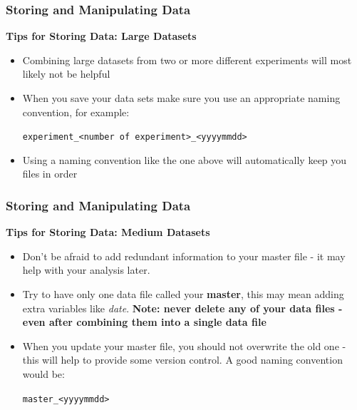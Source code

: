 \documentclass{beamer}
\begin{document}
\begin{frame}[fragile]
\frametitle{Storing and Manipulating Data}
\textbf{Tips for Storing Data: Large Datasets}\\
\vspace{0.5cm}
\begin{itemize}
\item Combining large datasets from two or more different experiments will most likely not be helpful
\vspace{0.5cm}
\item When you save your data sets make sure you use an appropriate naming convention, for example:
\begin{center}
\verb|experiment_<number of experiment>_<yyyymmdd>|
\end{center}
\vspace{0.5cm}
\item Using a naming convention like the one above will automatically keep you files in order
\end{itemize}
\end{frame}

\begin{frame}[fragile]
\frametitle{Storing and Manipulating Data}
\textbf{Tips for Storing Data: Medium Datasets}\\
\vspace{0.5cm}
\begin{itemize}
\item Don't be afraid to add redundant information to your master file - it may help with your analysis later.
\vspace{0.5cm}
\item Try to have only one data file called your \textbf{master}, this may mean adding extra variables like \textit{date}. \textbf{Note: never delete any of your data files - even after combining them into a single data file}
\vspace{0.5cm}
\item When you update your master file, you should not overwrite the old one - this will help to provide some version control. A good naming convention would be:
\begin{center}
\verb|master_<yyyymmdd>|
\end{center}
\end{itemize}
\end{frame}

\end{document}
